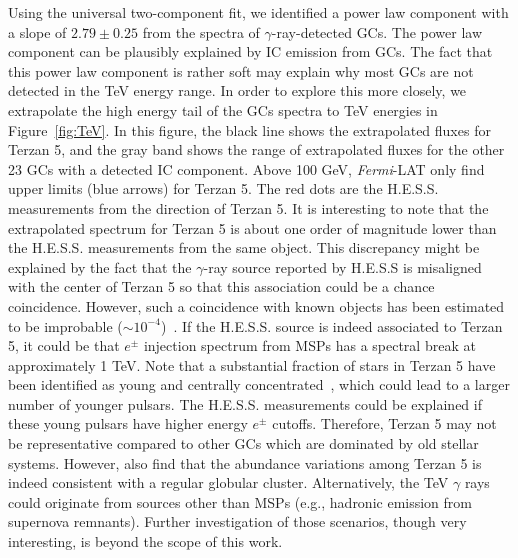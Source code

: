 \documentclass[doublespace,nopageskip]{VTthesis} %
\begin{document}
Using the universal two-component fit, we identified a power law component with a slope of $2.79 \pm  0.25$ from the spectra of $\gamma$-ray-detected GCs. The power law component can be plausibly explained by IC emission from GCs. The fact that this power law component is rather soft may explain why most GCs are not detected in the TeV energy range. In order to explore this more closely, we extrapolate the high energy tail of the GCs spectra to TeV energies in Figure~\ref{fig:TeV}. In this figure, the black line shows the extrapolated fluxes for Terzan 5, and the gray band shows the range of extrapolated fluxes for the other 23 GCs with a detected IC component. Above 100 GeV, {\it Fermi}-LAT only find upper limits (blue arrows) for Terzan 5. The red dots are the H.E.S.S. measurements from the direction of Terzan 5. It is interesting to note that the extrapolated spectrum for Terzan 5 is about one order of magnitude lower than the H.E.S.S. measurements from the same object. This discrepancy might be explained by the fact that the $\gamma$-ray source reported by H.E.S.S is misaligned with the center of Terzan 5 so that this association could be a chance coincidence. However, such a coincidence with known objects has been estimated to be improbable ($\sim 10^{-4}$)~\citep{2011A&A...531L..18H}. If the H.E.S.S. source is indeed associated to Terzan 5, it could be that $e^\pm$ injection spectrum from MSPs has a spectral break at approximately 1 TeV. Note that a substantial fraction of stars in Terzan 5 have been identified as young and centrally concentrated~\citep{2016ApJ...828...75F,2020BAAA..61R...90G}, which could lead to a larger number of younger pulsars. The H.E.S.S. measurements could be explained if these young pulsars have higher energy $e^\pm$ cutoffs. Therefore, Terzan 5 may not be representative compared to other GCs which are dominated by old stellar systems. However, \citet{2019AJ....158...14N} also find that the abundance variations among Terzan 5 is indeed consistent with a regular globular cluster. Alternatively, the TeV $\gamma$ rays could originate from sources other than MSPs (e.g., hadronic emission from supernova remnants). Further investigation of those scenarios, though very interesting, is beyond the scope of this work. 
\end{document}
